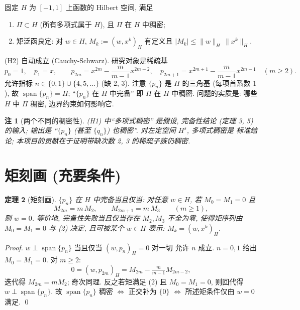 \documentclass[UTF8]{ctexart}
\newtheorem{theorem}{定理}[section]
\newtheorem{remark}[theorem]{注}
\begin{document}
固定 $H$ 为 $[-1,1]$ 上函数的 Hilbert 空间, 满足
\begin{enumerate}
	\item[(H1)] $\Pi \subset H$ (所有多项式属于 $H$), 且 $\Pi$ 在 $H$ 中稠密;
	\item[(H2)] 矩泛函良定: 对 $w \in H$, $M_k := (w, x^k)_H$ 有定义且
		$|M_k| \leq \|w\|_H\, \|x^k\|_H$.
\end{enumerate}
(H2) 自动成立 (Cauchy-Schwarz). 研究对象是稀疏基
\begin{equation}
	p_0 = 1, \quad p_1 = x, \qquad
	p_{2m} = x^{2m} - \frac{m}{m-1} x^{2m-2}, \quad
	p_{2m+1} = x^{2m+1} - \frac{m}{m-1} x^{2m-1} \quad (m \geq 2).
\end{equation}
允许指标 $n \in \{0,1\} \cup \{4,5,\dots\}$ (缺 2, 3). 注意 $\{p_n\}$
是 $\Pi$ 的三角基 (每项首系数 $1$), 故 $\operatorname{span}\{p_n\} = \Pi$;
``$\{p_n\}$ 在 $H$ 中完备'' 即 $\Pi$ 在 $H$ 中稠密. 问题的实质是:
哪些 $H$ 中 $\Pi$ 稠密, 边界约束如何影响它.

\begin{remark}[两个不同的稠密性]
	(H1) 中``多项式稠密'' 是假设, 完备性结论 (定理 3, 5) 的输入; 输出是
	``$\{p_n\}$ (甚至 $\{q_n\}$) 也稠密''. 对左定空间 $H^s$, 多项式稠密是
	标准结论; 本项目的贡献在于证明带缺次数 2, 3 的稀疏子族仍稠密.
\end{remark}

\section{矩刻画 (充要条件)}

\begin{theorem}[矩刻画]
	$\{p_n\}$ 在 $H$ 中完备当且仅当: 对任意 $w \in H$, 若
	$M_0 = M_1 = 0$ 且
	\begin{equation}
		M_{2m} = m\, M_2, \qquad M_{2m+1} = m\, M_3 \qquad (m \geq 1),
	\end{equation}
	则 $w = 0$. 等价地, 完备性失败当且仅当存在 $M_2, M_3$ 不全为零,
	使得矩序列由 $M_0 = M_1 = 0$ 与 (2) 决定, 且可被某个 $w \in H$ 表示: $M_k = (w, x^k)_H$.
\end{theorem}

\begin{proof}
	$w \perp \operatorname{span}\{p_n\}$ 当且仅当 $(w, p_n)_H = 0$ 对一切
	允许 $n$ 成立. $n = 0, 1$ 给出 $M_0 = M_1 = 0$. 对 $m \geq 2$:
	\[
		0 = (w, p_{2m})_H = M_{2m} - \tfrac{m}{m-1} M_{2m-2},
	\]
	迭代得 $M_{2m} = mM_2$; 奇次同理. 反之若矩满足 (2) 且 $M_0 = M_1 = 0$,
	则回代得 $w \perp \operatorname{span}\{p_n\}$. 故
	$\operatorname{span}\{p_n\}$ 稠密 $\iff$ 正交补为 $\{0\}$
	$\iff$ 所述矩条件仅由 $w = 0$ 满足. \qed
\end{proof}
\end{document}
